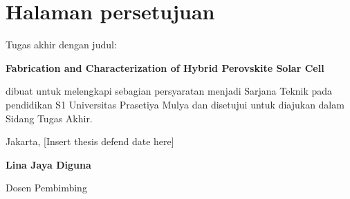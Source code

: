 \section*{Halaman persetujuan}
\noindent Tugas akhir dengan judul:
\begin{center}
    \textbf{Fabrication and Characterization of Hybrid Perovskite Solar Cell}
\end{center} \par
\noindent dibuat untuk melengkapi sebagian persyaratan menjadi Sarjana Teknik pada pendidikan S1 Universitas Prasetiya Mulya dan disetujui untuk diajukan dalam Sidang Tugas Akhir. \par
\vspace{15cm}
\noindent Jakarta, [Insert thesis defend date here] \par
\vspace{1cm}
\noindent \textbf{Lina Jaya Diguna} \par
\noindent Dosen Pembimbing